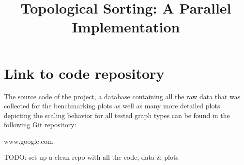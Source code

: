 \documentclass[letterpaper]{article}
\title{Topological Sorting: A Parallel Implementation}
\begin{document}
\maketitle








\section{Link to code repository}
%
The source code of the project, a database containing all the raw data that was collected for the benchmarking plots as well as many more detailed plots depicting the scaling behavior for all tested graph types can be found in the following Git repository:
\begin{center}
	www.google.com
\end{center}
{\Large TODO: set up a clean repo with all the code, data \& plots}




\end{document}
